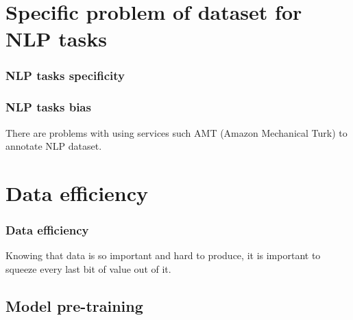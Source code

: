 \documentclass[9pt]{beamer}
\begin{document}
\section{Specific problem of dataset for NLP tasks}

\begin{frame}

  \frametitle{NLP tasks specificity}

\end{frame}

\begin{frame}

  \frametitle{NLP tasks bias}

  There are problems with using services such AMT (Amazon Mechanical
  Turk) to annotate NLP dataset.

\end{frame}
\section{Data efficiency}

\begin{frame}
  \frametitle{Data efficiency}

  Knowing that data is so important and hard to produce, it is
  important to squeeze every last bit of value out of it.

\end{frame}

\subsection{Model pre-training}
\end{document}
